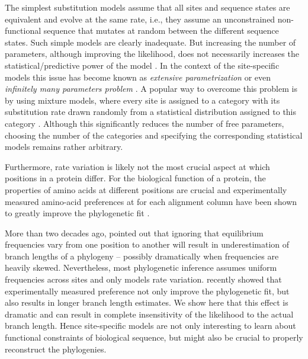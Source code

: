 \documentclass[aps,rmp, onecolumn]{revtex4}
\begin{document}
The simplest substitution models assume that all sites and sequence states are equivalent and evolve at the same rate, i.e., they assume an unconstrained non-functional sequence that mutates at random between the different sequence states.
Such simple models are clearly inadequate.
But increasing the number of parameters, although improving the likelihood, does not necessarily increases the statistical/predictive power of the model \cite{scheffler2014validity}.
In the context of the site-specific models this issue has become known as {\em extensive parametrization} or even {\em infinitely many parameters problem} \cite{felsenstein2001taking,Rodrigue557,kumar2011statistics,spielman2016extensively}.
%
A popular way to overcome this problem is by using mixture models, where every site is assigned to a category with its substitution rate drawn randomly from a statistical distribution assigned to this category \cite{blanquart2008site,mayrose2005gamma,jia2014impact,kosakovsky2004simple,le2012modeling,jayaswal2014mixture}.
Although this significantly reduces the number of free parameters, choosing the number of the categories and specifying the corresponding statistical models remains rather arbitrary.

Furthermore, rate variation is likely not the most crucial aspect at which positions in a protein differ.
For the biological function of a protein, the properties of amino acids at different positions are crucial and experimentally measured amino-acid preferences at for each alignment column have been shown to greatly improve the phylogenetic fit \cite{bloom2014experimentally,bloom2014experimentally1}.

\citep{felsenstein1981evolutionary}

More than two decades ago, \citet{halpern_evolutionary_1998} pointed out that ignoring that equilibrium frequencies vary from one position to another will result in underestimation of branch lengths of a phylogeny -- possibly dramatically when frequencies are heavily skewed.
Nevertheless, most phylogenetic inference assumes uniform frequencies across sites and only models rate variation.
\citet{hilton_modeling_2018} recently showed that experimentally measured preference not only improve the phylogenetic fit, but also results in longer branch length estimates.
We show here that this effect is dramatic and can result in complete insensitivity of the likelihood to the actual branch length.
Hence site-specific models are not only interesting to learn about functional constraints of biological sequence, but might also be crucial to properly reconstruct the phylogenies.
\end{document}
